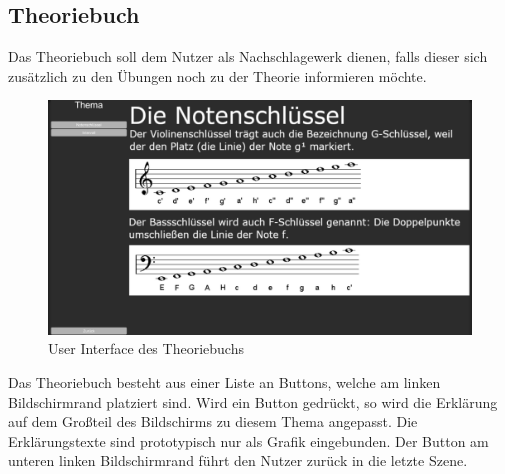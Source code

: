 \subsection*{Theoriebuch}
Das Theoriebuch soll dem Nutzer als Nachschlagewerk dienen, falls dieser sich zusätzlich zu den Übungen noch zu der Theorie informieren möchte. 
\begin{figure}[H]
    \centering
    \includegraphics[width=1\textwidth]{Bilder/theorie.png}
    \caption{User Interface des Theoriebuchs}
    \label{sec:hps_algo}
\end{figure}
Das Theoriebuch besteht aus einer Liste an Buttons, welche am linken Bildschirmrand platziert sind. Wird ein Button gedrückt, so wird die Erklärung auf dem Großteil des Bildschirms zu diesem Thema angepasst. Die Erklärungstexte sind prototypisch nur als Grafik eingebunden. Der Button am unteren linken Bildschirmrand führt den Nutzer zurück in die letzte Szene. 

\newpage

